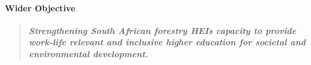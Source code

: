 \documentclass[
  11pt,
]{article}
\begin{document}
\hypertarget{wider-objective}{%
\paragraph{Wider Objective}\label{wider-objective}}

\begin{quote}
\textbf{\emph{Strengthening South African forestry HEIs capacity to
provide work-life relevant and inclusive higher education for societal
and environmental development.}}
\end{quote}

\providecommand{\docline}[3]{\noalign{\global\setlength{\arrayrulewidth}{#1}}\arrayrulecolor[HTML]{#2}\cline{#3}}

\setlength{\tabcolsep}{2pt}

\renewcommand*{\arraystretch}{1.5}
\end{document}
